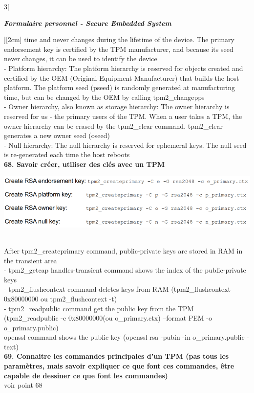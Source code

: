 \begin{multicols}{3}[\centerline{ \large\em \textbf{Formulaire personnel - Secure Embedded System}}][2cm]
time and never changes during the lifetime of the device. The primary endorsement key is certified by the TPM manufacturer, and because its seed never changes, it can be used to identify the device\\
- Platform hierarchy: The platform hierarchy is reserved for objects created and certified by the OEM (Original Equipment Manufacturer) that builds the host platform. The platform seed (pseed) is randomly generated at manufacturing time, but can be changed by the OEM by calling tpm2\_changepps\\
- Owner hierarchy, also known as storage hierarchy: The owner hierarchy is reserved for us - the primary users of the TPM. When a user takes a TPM, the owner hierarchy can be erased by the tpm2\_clear command. tpm2\_clear generates a new owner seed (oseed)\\
- Null hierarchy: The null hierarchy is reserved for ephemeral keys. The null seed is re-generated each time the host reboots
\\ \textbf{68. Savoir créer, utiliser des clés avec un TPM\\}
\begin{minipage}{\linewidth}
	\centering
    \includegraphics[width =0.6\columnwidth]{images/48.png}
\end{minipage}\\
After tpm2\_createprimary command, public-private keys are stored in RAM in the transient area\\
- tpm2\_getcap handles-transient command shows the index of the public-private keys\\
- tpm2\_flushcontext command deletes keys from RAM (tpm2\_flushcontext 0x80000000 ou tpm2\_flushcontext -t)\\
- tpm2\_readpublic command get the public key from the TPM (tpm2\_readpublic -c 0x80000000(ou o\_primary.ctx) --format PEM -o o\_primary.public)\\
openssl command shows the public key (openssl rsa -pubin -in o\_primary.public -text)\\
\textbf{69. Connaitre les commandes principales d’un TPM (pas tous les paramètres, mais savoir expliquer ce que font ces commandes, être capable de dessiner ce que font les commandes)\\}
voir point 68\\

\end{multicols}
